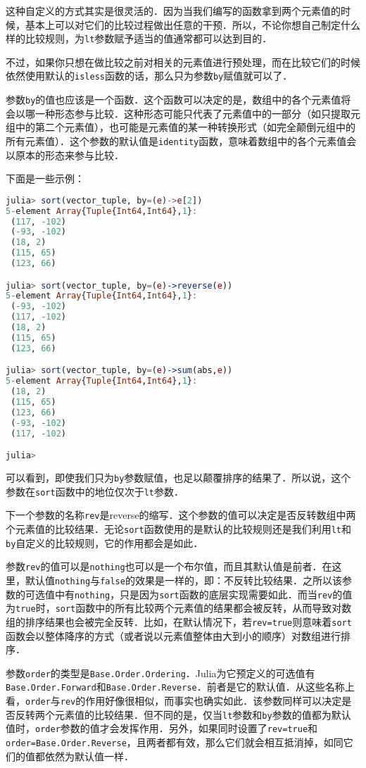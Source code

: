 这种自定义的方式其实是很灵活的．因为当我们编写的函数拿到两个元素值的时候，基本上可以对它们的比较过程做出任意的干预．所以，不论你想自己制定什么样的比较规则，为\verb|lt|参数赋予适当的值通常都可以达到目的．

不过，如果你只想在做比较之前对相关的元素值进行预处理，而在比较它们的时候依然使用默认的\verb|isless|函数的话，那么只为参数\verb|by|赋值就可以了．

参数\verb|by|的值也应该是一个函数．这个函数可以决定的是，数组中的各个元素值将会以哪一种形态参与比较．这种形态可能只代表了元素值中的一部分（如只提取元组中的第二个元素值），也可能是元素值的某一种转换形式（如完全颠倒元组中的所有元素值）．这个参数的默认值是\verb|identity|函数，意味着数组中的各个元素值会以原本的形态来参与比较．

下面是一些示例：

\begin{lstlisting}[language=julia]
julia> sort(vector_tuple, by=(e)->e[2])
5-element Array{Tuple{Int64,Int64},1}:
 (117, -102)
 (-93, -102)
 (18, 2)    
 (115, 65)  
 (123, 66)  

julia> sort(vector_tuple, by=(e)->reverse(e))
5-element Array{Tuple{Int64,Int64},1}:
 (-93, -102)
 (117, -102)
 (18, 2)    
 (115, 65)  
 (123, 66)  

julia> sort(vector_tuple, by=(e)->sum(abs,e))
5-element Array{Tuple{Int64,Int64},1}:
 (18, 2)    
 (115, 65)  
 (123, 66)  
 (-93, -102)
 (117, -102)

julia> 
\end{lstlisting}

可以看到，即使我们只为\verb|by|参数赋值，也足以颠覆排序的结果了．所以说，这个参数在\verb|sort|函数中的地位仅次于\verb|lt|参数．

下一个参数的名称\verb|rev|是reverse的缩写．这个参数的值可以决定是否反转数组中两个元素值的比较结果．无论\verb|sort|函数使用的是默认的比较规则还是我们利用\verb|lt|和\verb|by|自定义的比较规则，它的作用都会是如此．

参数\verb|rev|的值可以是\verb|nothing|也可以是一个布尔值，而且其默认值是前者．在这里，默认值\verb|nothing|与\verb|false|的效果是一样的，即：不反转比较结果．之所以该参数的可选值中有\verb|nothing|，只是因为\verb|sort|函数的底层实现需要如此．而当\verb|rev|的值为\verb|true|时，\verb|sort|函数中的所有比较两个元素值的结果都会被反转，从而导致对数组的排序结果也会被完全反转．比如，在默认情况下，若\verb|rev=true|则意味着\verb|sort|函数会以整体降序的方式（或者说以元素值整体由大到小的顺序）对数组进行排序．

参数\verb|order|的类型是\verb|Base.Order.Ordering|．Julia为它预定义的可选值有\verb|Base.Order.Forward|和\verb|Base.Order.Reverse|．前者是它的默认值．从这些名称上看，\verb|order|与\verb|rev|的作用好像很相似，而事实也确实如此．该参数同样可以决定是否反转两个元素值的比较结果．但不同的是，仅当\verb|lt|参数和\verb|by|参数的值都为默认值时，\verb|order|参数的值才会发挥作用．另外，如果同时设置了\verb|rev=true|和\verb|order=Base.Order.Reverse|，且两者都有效，那么它们就会相互抵消掉，如同它们的值都依然为默认值一样．

